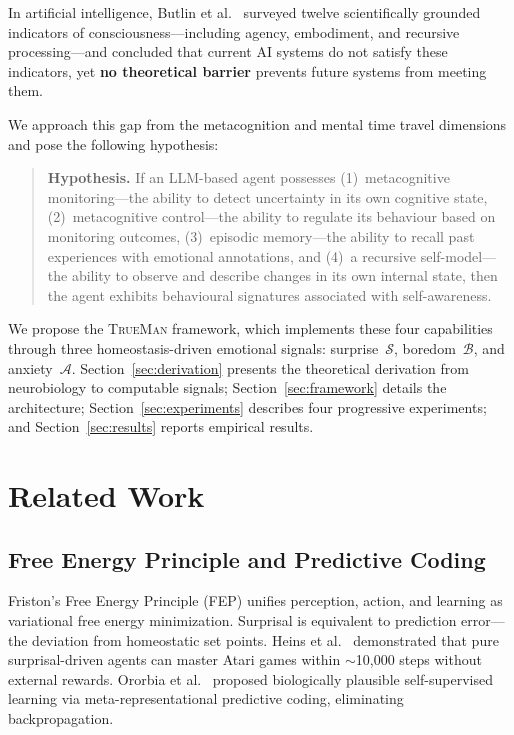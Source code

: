 \documentclass[pdflatex,sn-mathphys-num]{sn-jnl}
\newcommand{\TrueMan}{\textsc{TrueMan}}
\newcommand{\surprise}{\mathcal{S}}
\newcommand{\boredom}{\mathcal{B}}
\newcommand{\anxiety}{\mathcal{A}}
\theoremstyle{thmstyleone}%
\theoremstyle{thmstyletwo}%
\theoremstyle{thmstylethree}%
\begin{document}
In artificial intelligence, Butlin et al.\ \cite{butlin2023consciousness} surveyed twelve scientifically grounded indicators of consciousness---including agency, embodiment, and recursive processing---and concluded that current AI systems do not satisfy these indicators, yet \textbf{no theoretical barrier} prevents future systems from meeting them.

We approach this gap from the metacognition and mental time travel dimensions and pose the following hypothesis:

\begin{quote}
\textbf{Hypothesis.} If an LLM-based agent possesses (1)~metacognitive monitoring---the ability to detect uncertainty in its own cognitive state, (2)~metacognitive control---the ability to regulate its behaviour based on monitoring outcomes, (3)~episodic memory---the ability to recall past experiences with emotional annotations, and (4)~a recursive self-model---the ability to observe and describe changes in its own internal state, then the agent exhibits behavioural signatures associated with self-awareness.
\end{quote}

We propose the \TrueMan{} framework, which implements these four capabilities through three homeostasis-driven emotional signals: surprise~$\surprise$, boredom~$\boredom$, and anxiety~$\anxiety$. Section~\ref{sec:derivation} presents the theoretical derivation from neurobiology to computable signals; Section~\ref{sec:framework} details the architecture; Section~\ref{sec:experiments} describes four progressive experiments; and Section~\ref{sec:results} reports empirical results.

\section{Related Work}\label{sec:related}

\subsection{Free Energy Principle and Predictive Coding}

Friston's Free Energy Principle (FEP) \cite{friston2022active} unifies perception, action, and learning as variational free energy minimization. Surprisal is equivalent to prediction error---the deviation from homeostatic set points. Heins et al.\ \cite{heins2025axiom} demonstrated that pure surprisal-driven agents can master Atari games within $\sim$10,000 steps without external rewards. Ororbia et al.\ \cite{ororbia2025meta} proposed biologically plausible self-supervised learning via meta-representational predictive coding, eliminating backpropagation.
\end{document}
